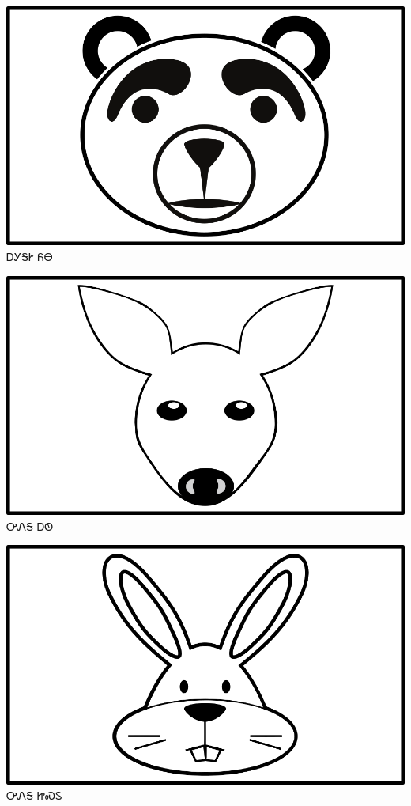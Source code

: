 \documentclass[avery5371]{flashcards}%
\begin{document}
\begin{flashcard}{
\includegraphics[width=0.95\columnwidth,height=.51\columnwidth,keepaspectratio]{../artwork/objects-animate/yona}
}\Huge ᎠᎩᎦᎨ ᏲᎾ
\end{flashcard}

\begin{flashcard}{
\includegraphics[width=0.95\columnwidth,height=.51\columnwidth,keepaspectratio]{../artwork/objects-animate/ahwi}
}\Huge ᎤᏁᎦ ᎠᏫ
\end{flashcard}

\begin{flashcard}{
\includegraphics[width=0.95\columnwidth,height=.51\columnwidth,keepaspectratio]{../artwork/objects-animate/jisdu}
}\Huge ᎤᏁᎦ ᏥᏍᏚ
\end{flashcard}
\end{document}
